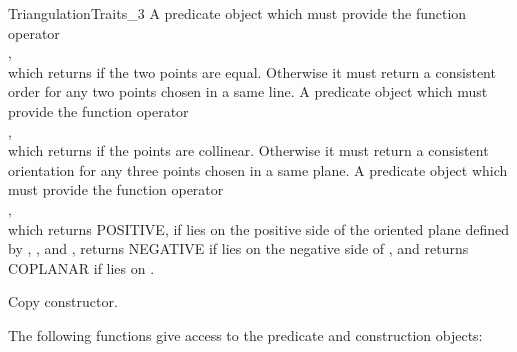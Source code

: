 \begin{ccRefConcept}{TriangulationTraits_3}
{A predicate object which must provide the function operator\\ 
,\\
which returns  if the two points are equal.  Otherwise it must
return a consistent order for any two points chosen in a same line.}
\ccGlue
{}
{A predicate object which must provide the function operator\\
,\\
which returns  if the points are collinear.  Otherwise it must
return a consistent orientation for any three points chosen in a same plane.
}
\ccGlue
{}
{A predicate object which must provide the function operator\\
,\\
which returns POSITIVE, if  lies on the positive side of the oriented
plane  defined by , , and , returns NEGATIVE if
 lies on the negative side of , and returns COPLANAR if 
lies on .}

\ccCreation
{}
\ccThreeToTwo

\ccGlue
{}
{Copy constructor.}

\ccOperations

The following functions give access to the predicate and construction objects:


\ccGlue
{}
\ccGlue
{}

\ccGlue
{}
\ccGlue
{}


\ccHasModels

\\
\\
\\
\\

\end{ccRefConcept}
